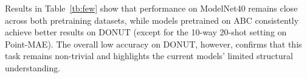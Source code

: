 Results in Table~\ref{tb:few} show that performance on ModelNet40 remains close across both pretraining datasets, while models pretrained on ABC consistently achieve better results on DONUT (except for the 10-way 20-shot setting on Point-MAE). The overall low accuracy on DONUT, however, confirms that this task remains non-trivial and highlights the current models’ limited structural understanding.
